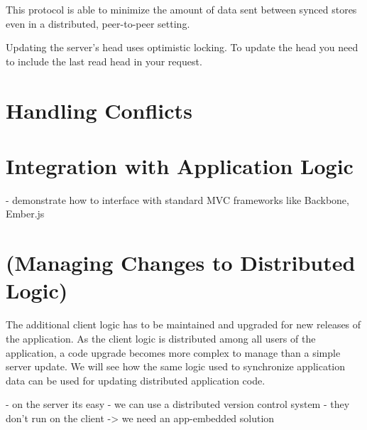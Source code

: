 This protocol is able to minimize the amount of data sent between synced
stores even in a distributed, peer-to-peer setting.

Updating the server's head uses optimistic locking. To update the head
you need to include the last read head in your request.

\section{Handling Conflicts}

\section{Integration with Application Logic}
- demonstrate how to interface with standard MVC frameworks like Backbone, Ember.js

\section{(Managing Changes to Distributed Logic)}
The additional client logic has to be maintained and upgraded for new releases of the application. As the client logic is distributed among all users of the application, a code upgrade becomes more complex to manage than a simple server update. We will see how the same logic used to synchronize application data can be used for updating distributed application code.

- on the server its easy - we can use a distributed version control system
- they don't run on the client -> we need an app-embedded solution

